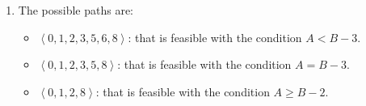 \begin{enumerate}
\begin{itemize}
        \end{itemize}
    \item The possible paths are: 
        \begin{itemize}
            \item $\left\langle 0,1,2,3,5,6,8 \right\rangle$: that is feasible with the condition $A < B-3$. 
            \item $\left\langle 0,1,2,3,5,8 \right\rangle$: that is feasible with the condition $A=B-3 $. 
            \item $\left\langle 0,1,2,8 \right\rangle$: that is feasible with the condition $A \geq B-2$. 
        \end{itemize}
\end{enumerate}
